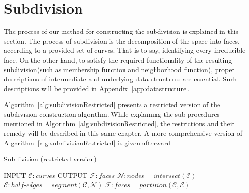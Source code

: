 \section{Subdivision}
The process of our method for constructing the subdivision is explained in this section.
The process of subdivision is the decomposition of the space into faces, according to a provided set of curves.
That is to say, identifying every irreducible face.
On the other hand, to satisfy the required functionality of the resulting subdivision(such as membership function and neighborhood function), proper descriptions of intermediate and underlying data structures are essential.
Such descriptions will be provided in Appendix~\ref{app:datastructure}.\bigskip

Algorithm~\ref{alg:subdivisionRestricted} presents a restricted version of the subdivision construction algorithm.
While explaining the sub-procedures mentioned in Algorithm~\ref{alg:subdivisionRestricted}, the restrictions and their remedy will be described in this same chapter.
A more comprehensive version of Algorithm~\ref{alg:subdivisionRestricted} is given afterward.

\begin{algorithm}
  \caption {Subdivision (restricted version)}
  \label{alg:subdivisionRestricted}
  \begin{algorithmic}    
    \STATE INPUT  $\mathcal{C}:curves$
    \STATE OUTPUT  $\mathcal{F}:faces$
    \STATE \quad
    \STATE $\mathcal{N}:nodes = \mathit{intersect} \left( \mathcal{C} \right)$
    \STATE $\mathcal{E}:half\text{-}edges = \mathit{segment} \left( \mathcal{C}, \mathcal{N} \right)$
    \STATE $ \mathcal{F}:faces = \mathit{partition} \left(\mathcal{C},\mathcal{E} \right)$
  \end{algorithmic}
\end{algorithm}

